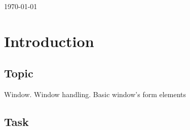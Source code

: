 \documentclass[12pt]{article}
\begin{document}
\begin{titlepage}
\begin{center}
      \vspace{5 mm}


      {\large \today}\\[3cm] %




      \vfill %
      \end{center}
      \end{titlepage}



  \section{Introduction}

  \subsection{Topic}

  Window. Window handling. Basic window’s form elements

  \subsection{Task}
\end{document}
